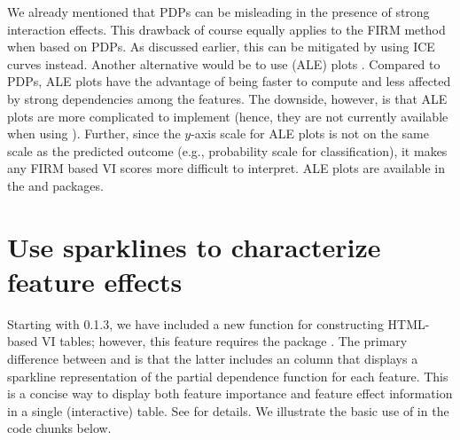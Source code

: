 We already mentioned that PDPs can be misleading in the presence of
strong interaction effects. This drawback of course equally applies to
the FIRM method when based on PDPs. As discussed earlier, this can be
mitigated by using ICE curves instead. Another alternative would be to
use  (ALE) plots
\citep{apley-2016-visualizing}. Compared to PDPs, ALE plots have the
advantage of being faster to compute and less affected by strong
dependencies among the features. The downside, however, is that ALE
plots are more complicated to implement (hence, they are not currently
available when using ). Further, since the
\(y\)-axis scale for ALE plots is not on the same scale as the predicted
outcome (e.g., probability scale for classification), it makes any FIRM
based VI scores more difficult to interpret. ALE plots are available in
the  \citep{R-ALEPlot} and  packages.

\section{Use sparklines to characterize feature effects}

Starting with  0.1.3, we have included a new function
 for constructing HTML-based VI tables; however,
this feature requires the  package \citep{R-DT}. The primary
difference between  and  is that the
latter includes an  column that displays a sparkline
representation of the partial dependence function for each feature. This
is a concise way to display both feature importance and feature effect
information in a single (interactive) table. See
 for details. We illustrate the basic use of
 in the code chunks below.

